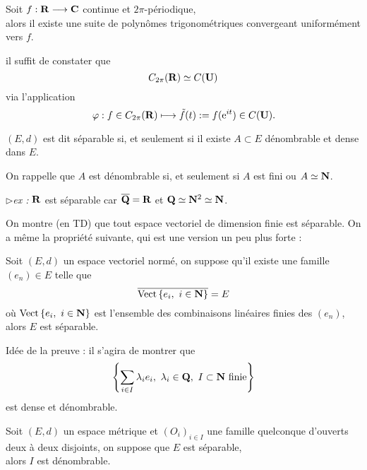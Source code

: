 \documentclass[a4paper,11pt, twoside]{article}
\begin{document}
\begin{corollaire}
  Soit $f:\mathbf R\longrightarrow\mathbf C$ continue et $2\pi$-périodique,\\

  alors il existe une suite de polynômes trigonométriques convergeant uniformément vers $f$.
\end{corollaire}

\begin{Proof}
  il suffit de constater que 
  $$C_{2\pi}(\mathbf R)\simeq C(\mathbf U)$$
  via l'application
  $$\varphi : f\in C_{2\pi}(\mathbf R)\longmapsto \tilde f(t):=f(\mathrm e^{it})\in C(\mathbf U).$$
\end{Proof}




\begin{Def}
  $(E,d)$ est dit séparable si, et seulement si il existe $A\subset E$ dénombrable et dense dans $E$.
\end{Def}

On rappelle que $A$ est dénombrable si, et seulement si $A$ est fini ou $A\simeq \mathbf N$.

$\triangleright$\emph{ex : }$\mathbf R$ est séparable car $\overline{\mathbf Q}=\mathbf R$ et $\mathbf Q\simeq \mathbf N^2\simeq \mathbf N$.

On montre (en TD) que tout espace vectoriel de dimension finie est séparable. On a même la propriété suivante, qui est une version un peu plus forte :


\begin{prop}
  Soit $(E,d)$ un espace vectoriel normé, on suppose qu'il existe une famille $(e_n)\in E$ telle que 
  $$\overline{\mathrm{Vect}\ens{e_i,\ i\in \mathbf N}}=E$$
  où $\mathrm{Vect}\left\{e_i,\ i\in \mathbf N\right\}$ est l'ensemble des combinaisons linéaires finies des $(e_n)$,\\

  alors $E$ est séparable.
\end{prop}


\begin{Proof}
  Idée de la preuve : il s'agira de montrer que 
  $$\left\{\sum_{i\in I}\lambda_i e_i,\ \lambda_i\in\mathbf Q,\ I\subset\N\text{ finie}\right\}$$
  est dense et dénombrable.
\end{Proof}


\begin{prop}
  Soit $(E,d)$ un espace métrique et $(O_i)_{i\in I}$ une famille quelconque d'ouverts deux à deux disjoints, on suppose que $E$ est séparable,\\

  alors $I$ est dénombrable.
\end{prop}
\end{document}
